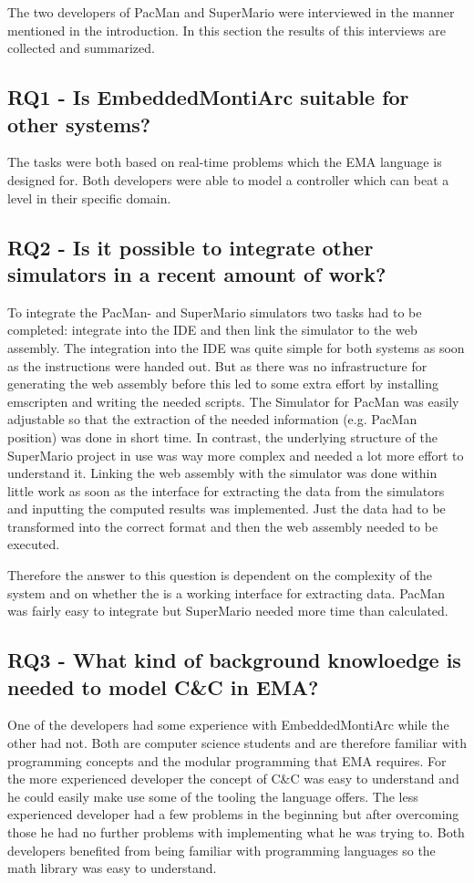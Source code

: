 The two developers of PacMan and SuperMario were interviewed in the manner mentioned in the introduction. In this section the results of this interviews are collected and summarized.

\subsection{RQ1 - Is EmbeddedMontiArc suitable for other systems?}
The tasks were both based on real-time problems which the EMA language is designed for. Both developers were able to model a controller which can beat a level in their specific domain.

\subsection{RQ2 - Is it possible to integrate other simulators in a recent amount of work?}
To integrate the PacMan- and SuperMario simulators two tasks had to be completed: integrate into the IDE and then link the simulator to the web assembly. The integration into the IDE was quite simple for both systems as soon as the instructions were handed out. But as there was no infrastructure for generating the web assembly before this led to some extra effort by installing emscripten and writing the needed scripts. The Simulator for PacMan was easily adjustable so that the extraction of the needed information (e.g. PacMan position) was done in short time. In contrast, the underlying structure of the SuperMario project in use was way more complex and needed a lot more effort to understand it. Linking the web assembly with the simulator was done within little work as soon as the interface for extracting the data from the simulators and inputting the computed results was implemented. Just the data had to be transformed into the correct format and then the web assembly needed to be executed.

Therefore the answer to this question is dependent on the complexity of the system and on whether the is a working interface for extracting data. PacMan was fairly easy to integrate but SuperMario needed more time than calculated.

\subsection{RQ3 - What kind of background knowloedge is needed to model C\&C in EMA?}
One of the developers had some experience with EmbeddedMontiArc while the other had not. Both are computer science students and are therefore familiar with programming concepts and the modular programming that EMA requires. For the more experienced developer the concept of C\&C was easy to understand and he could easily make use some of the tooling the language offers. The less experienced developer had a few problems in the beginning but after overcoming those he had no further problems with implementing what he was trying to. Both developers benefited from being familiar with programming languages so the math library was easy to understand. 

